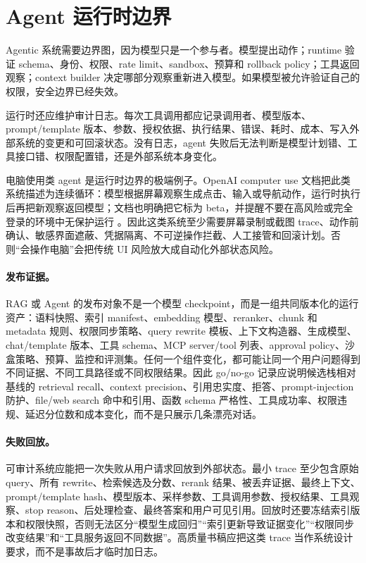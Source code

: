 \documentclass[UTF8,zihao=-4,openany]{ctexbook}
\begin{document}
\section{Agent 运行时边界}
Agentic 系统需要边界图，因为模型只是一个参与者。模型提出动作；runtime 验证 schema、身份、权限、rate limit、sandbox、预算和 rollback policy；工具返回观察；context builder 决定哪部分观察重新进入模型。如果模型被允许验证自己的权限，安全边界已经失效。

运行时还应维护审计日志。每次工具调用都应记录调用者、模型版本、prompt/template 版本、参数、授权依据、执行结果、错误、耗时、成本、写入外部系统的变更和可回滚状态。没有日志，agent 失败后无法判断是模型计划错、工具接口错、权限配置错，还是外部系统本身变化。

电脑使用类 agent 是运行时边界的极端例子。OpenAI computer use 文档把此类系统描述为连续循环：模型根据屏幕观察生成点击、输入或导航动作，运行时执行后再把新观察返回模型；文档也明确把它标为 beta，并提醒不要在高风险或完全登录的环境中无保护运行 \cite{openai2026computeruse}。因此这类系统至少需要屏幕录制或截图 trace、动作前确认、敏感界面遮蔽、凭据隔离、不可逆操作拦截、人工接管和回滚计划。否则“会操作电脑”会把传统 UI 风险放大成自动化外部状态风险。

\paragraph{发布证据。}
RAG 或 Agent 的发布对象不是一个模型 checkpoint，而是一组共同版本化的运行资产：语料快照、索引 manifest、embedding 模型、reranker、chunk 和 metadata 规则、权限同步策略、query rewrite 模板、上下文构造器、生成模型、chat/template 版本、工具 schema、MCP server/tool 列表、approval policy、沙盒策略、预算、监控和评测集。任何一个组件变化，都可能让同一个用户问题得到不同证据、不同工具路径或不同权限结果。因此 go/no-go 记录应说明候选栈相对基线的 retrieval recall、context precision、引用忠实度、拒答、prompt-injection 防护、file/web search 命中和引用、函数 schema 严格性、工具成功率、权限违规、延迟分位数和成本变化，而不是只展示几条漂亮对话。

\paragraph{失败回放。}
可审计系统应能把一次失败从用户请求回放到外部状态。最小 trace 至少包含原始 query、所有 rewrite、检索候选及分数、rerank 结果、被丢弃证据、最终上下文、prompt/template hash、模型版本、采样参数、工具调用参数、授权结果、工具观察、stop reason、后处理检查、最终答案和用户可见引用。回放时还要冻结索引版本和权限快照，否则无法区分“模型生成回归”“索引更新导致证据变化”“权限同步改变结果”和“工具服务返回不同数据”。高质量书稿应把这类 trace 当作系统设计要求，而不是事故后才临时加日志。
\end{document}
